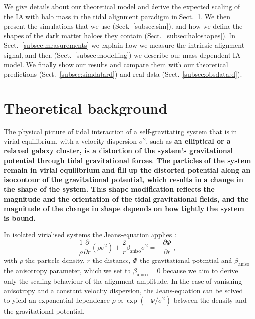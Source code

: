 \documentclass[a4paper,fleqn,usenatbib]{mnras}
\newenvironment{correction}
 {\bfseries}%
  {}%
\begin{document}
We give details about our theoretical model and derive the expected scaling of the IA with halo mass in the tidal alignment paradigm in Sect.~\ref{sec:theory}. We then present the simulations that we use (Sect.~\ref{subsec:sim}), and how we define the shapes of the dark matter haloes they contain (Sect.~\ref{subsec:haloshapes}). In Sect.~\ref{subsec:measurements} we explain how we measure the intrinsic alignment signal, and then (Sect.~\ref{subsec:modelling}) we describe our mass-dependent IA model. We finally show our results and compare them with our theoretical predictions (Sect.~\ref{subsec:simdatard}) and real data (Sect.~\ref{subsec:obsdatard}).

\section{Theoretical background}
\label{sec:theory}
The physical picture of tidal interaction of a self-gravitating system that is in virial equilibrium, with a velocity dispersion $\sigma^2$, such as \begin{correction}an elliptical or a relaxed galaxy cluster\end{correction}, is a distortion of the system's gravitational potential through tidal gravitational forces. The particles of the system remain in virial equilibrium and fill up the distorted potential along an isocontour of the gravitational potential, which results in a change in the shape of the system. This shape modification reflects the magnitude and the orientation of the tidal gravitational fields, and the magnitude of the change in shape depends on how tightly the system is bound.

In isolated virialised systems the Jeans-equation applies \citep[see e.g.][]{BinneyTremaine2008}:
\begin{equation}
\frac{1}{\rho}\frac{\partial}{\partial r}(\rho\sigma^2) + \frac{2}{r}\beta_\mathrm{aniso}\sigma^2 = 
-\frac{\partial\Phi}{\partial r} \ ,
\end{equation}
with $\rho$ the particle density, $r$ the distance, $\Phi$ the gravitational potential and $\beta_\mathrm{aniso}$ the anisotropy parameter, which we set to $\beta_\mathrm{aniso}=0$ because we aim to derive only the scaling behaviour of the alignment amplitude. In the case of vanishing anisotropy and a constant velocity dispersion, the Jeans-equation can be solved to yield an exponential dependence $\rho\propto\exp(-\Phi/\sigma^2)$ between the density and the gravitational potential.
\end{document}
